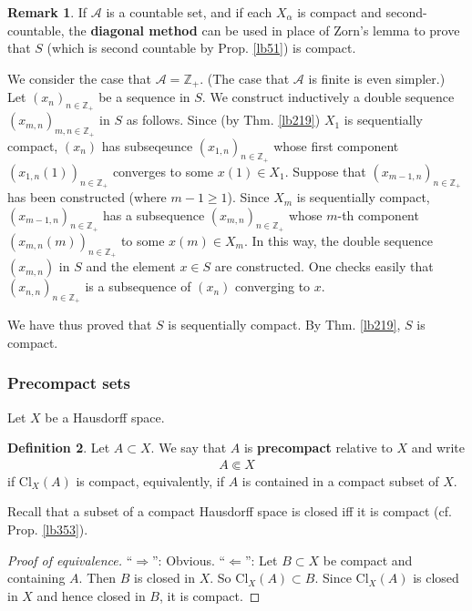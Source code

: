 \documentclass[12pt,b5paper,notitlepage]{article}
\theoremstyle{definition}
\newtheorem{df}{Definition}[subsection]
\newtheorem{rem}[df]{Remark}
\theoremstyle{plain}
\newcommand{\scr}{\mathscr}
\newcommand{\Zbb}{\mathbb Z}
\newcommand{\Cl}{\mathrm{Cl}}
\newcommand{\hqed}{\hfill\qedsymbol}
\numberwithin{equation}{section}
\begin{document}
\begin{rem}\label{lb52}
If $\scr A$ is a countable set, and if each $X_\alpha$ is compact and second-countable, the \textbf{diagonal method}  can be used in place of Zorn's lemma to prove that $S$ (which is second countable by Prop. \ref{lb51}) is compact.

We consider the case that $\scr A=\Zbb_+$. (The case that $\scr A$ is finite is even simpler.) Let $(x_n)_{n\in\Zbb_+}$ be a sequence in $S$. We construct inductively a double sequence $(x_{m,n})_{m,n\in\Zbb_+}$ in $S$ as follows. Since (by Thm. \ref{lb219}) $X_1$ is sequentially compact, $(x_n)$ has subseqeunce $(x_{1,n})_{n\in\Zbb_+}$ whose first component $(x_{1,n}(1))_{n\in\Zbb_+}$ converges to some $x(1)\in X_1$. Suppose that $(x_{m-1,n})_{n\in\Zbb_+}$ has been constructed (where $m-1\geq 1$). Since $X_m$ is sequentially compact, $(x_{m-1,n})_{n\in\Zbb_+}$ has a subsequence $(x_{m,n})_{n\in\Zbb_+}$ whose $m$-th component $(x_{m,n}(m))_{n\in\Zbb_+}$ to some $x(m)\in X_m$. In this way, the double sequence $(x_{m,n})$ in $S$ and the element $x\in S$ are constructed. One checks easily that $(x_{n,n})_{n\in\Zbb_+}$ is a subsequence of $(x_n)$ converging to $x$.  

We have thus proved that $S$ is sequentially compact. By Thm. \ref{lb219}, $S$ is compact. \hqed 
\end{rem}











\subsubsection{Precompact sets}


Let $X$ be a Hausdorff space. 

\begin{df}
Let $A\subset X$. We say that $A$ is \textbf{precompact} relative to $X$ and  write 
\begin{align*}
A\Subset X
\end{align*}
if $\Cl_X(A)$ is compact, equivalently, if $A$ is contained in a compact subset of $X$.
\end{df}

Recall that a subset of a compact Hausdorff space is closed iff it is compact (cf. Prop. \ref{lb353}).

\begin{proof}[Proof of equivalence]
``$\Rightarrow$'': Obvious. ``$\Leftarrow$'': Let $B\subset X$ be compact and containing $A$. Then $B$ is closed in $X$. So $\Cl_X(A)\subset B$. Since $\Cl_X(A)$ is closed in $X$ and hence closed in $B$, it is compact.
\end{proof}
\end{document}
